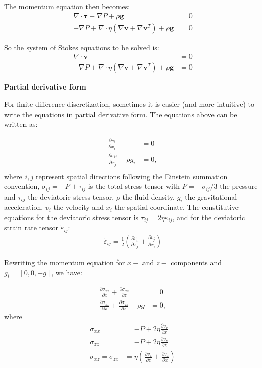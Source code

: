 \documentclass[a4paper,11pt]{article}
\begin{document}
The momentum equation then becomes:
\begin{align}
\nabla \cdot \bm{\tau}  -  \nabla P +\rho \textbf{g} &= 0 \\
-\nabla P + \nabla \cdot \eta\left(\nabla \textbf{v}+\nabla\textbf{v}^T\right)+\rho \textbf{g} &= 0
\end{align}

So the system of Stokes equations to be solved is:
\begin{align}
\nabla \cdot \textbf{v} &= 0 \\
-\nabla P + \nabla \cdot \eta\left(\nabla \textbf{v}+\nabla\textbf{v}^T\right)+\rho \textbf{g} &= 0
\end{align}

\textbf{Partial derivative form}

For finite difference discretization, sometimes it is easier (and more intuitive) to write the equations in partial derivative form. The equations above can be written as:

\begin{eqnarray}
\frac{\displaystyle \partial v_{i}}{\displaystyle \partial x_i} &= 0 \\
\frac{\displaystyle \partial \sigma_{ij}}{\displaystyle \partial x_j} + \rho g_i &= 0,\\
\end{eqnarray}
where $i,j$ represent spatial directions following the Einstein summation convention, $\sigma_{ij} = -P + \tau_{ij}$ is the total stress tensor with $P = -\sigma_{ij}/3$ the pressure and $\tau_{ij}$ the deviatoric stress tensor, $\rho$ the fluid density, $g_i$ the gravitational acceleration, $v_i$ the velocity and $x_i$ the spatial coordinate. The constitutive equations for the deviatoric stress tensor is $\tau_{ij} = 2\eta\dot{\varepsilon}_{ij}$, and for the deviatoric strain rate tensor $\dot{\varepsilon}_{ij}$:
\begin{align}
\dot{\varepsilon}_{ij} = \frac{1}{2}\left(\frac{\partial v_i}{\partial x_j}+\frac{\partial v_j}{\partial x_i}\right)
\end{align}

Rewriting the momentum equation for $x-$ and $z-$ components and $g_i = [0,0,-g]$, we have:

\begin{align}
\frac{\displaystyle \partial \sigma_{xx}}{\displaystyle \partial x}+\frac{\displaystyle \partial \sigma_{xz}}{\displaystyle \partial z} &= 0 \\
\frac{\displaystyle \partial \sigma_{zx}}{\displaystyle \partial x}+\frac{\displaystyle \partial \sigma_{zz}}{\displaystyle \partial z}-\rho g &= 0,
\end{align}
where 
\begin{align}
\sigma_{xx} &= -P + 2\eta\frac{\displaystyle \partial v_x}{\displaystyle \partial x}\\ 
\sigma_{zz} &= -P + 2\eta\frac{\displaystyle \partial v_z}{\displaystyle \partial z} \\
\sigma_{xz} = \sigma_{zx} &= \eta\left(\frac{\displaystyle \partial v_x}{\displaystyle \partial z}+\frac{\displaystyle \partial v_z}{\displaystyle \partial x}\right) 
\end{align}
\end{document}
